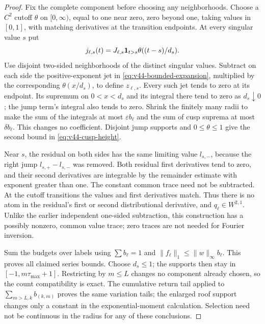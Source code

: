 \begin{proof}
Fix the complete component before choosing any neighborhoods. Choose a
$C^2$ cutoff $\theta$ on $[0,\infty)$, equal to one near zero,
zero beyond one, taking values in $[0,1]$, with matching derivatives
at the transition endpoints. At every singular value $s$ put
\[
 j_{\ell,s}(t)=J_{\ell,s}\mathbf1_{t>s}\theta((t-s)/d_s).
\]
Use disjoint two-sided neighborhoods of the distinct singular values.
Subtract on each side the positive-exponent jet in
\eqref{eq:v44-bounded-expansion}, multiplied by the corresponding
$\theta(x/d_s)$, to define $z_{\ell,s}$.
Every such jet tends to zero at its endpoint. Its supremum on
$0<x<d_s$ and its integral there tend to zero as $d_s\downarrow0$;
the jump term's integral also tends to zero. Shrink the finitely many
radii to make the sum of the integrals at most
$\varepsilon b_\ell$ and the sum of cusp suprema at most
$\delta b_\ell$. This changes no coefficient. Disjoint jump supports
and $0\le\theta\le1$ give the second bound in
\eqref{eq:v44-cusp-height}.

Near $s$, the residual on both sides has the same limiting value
$l_{s,-}$, because the right jump $l_{s,+}-l_{s,-}$ was removed.
Both residual first derivatives tend to zero, and their second
derivatives are integrable by the remainder estimate with exponent
greater than one. The constant common trace need not be subtracted.
At the cutoff transitions the values and first derivatives match.
Thus there is no atom in the residual's first or second distributional
derivative, and $q_\ell\in W^{2,1}$. Unlike the earlier independent
one-sided subtraction, this construction has a possibly nonzero,
common value trace; zero traces are not needed for Fourier inversion.

Sum the budgets over labels using $\sum b_\ell=1$ and
$\|f_\ell\|_1\le\|w\|_\infty b_\ell$. This proves all claimed
series bounds. Choose $d_s\le1$; the supports then stay in
$[-1,m\tau_{\max}+1]$. Restricting by $m\le L$ changes no component
already chosen, so the count compatibility is exact. The cumulative
return tail applied to $\sum_{m>L,k}b_{(k,m)}$ proves the same
variation tails; the enlarged roof support changes only a constant
in the exponential-moment calculation. Selection need not be continuous
in the radius for any of these conclusions.
\end{proof}

